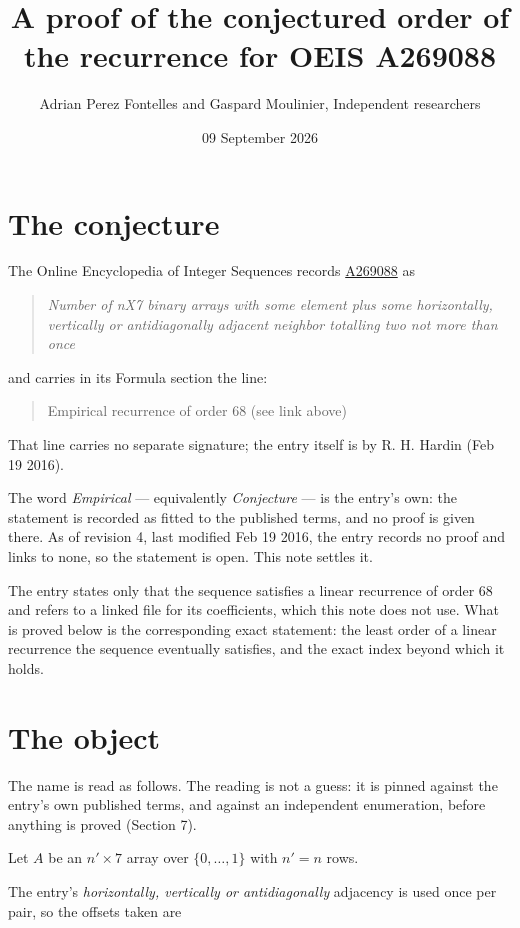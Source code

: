\documentclass[11pt]{article}
\title{A proof of the conjectured order of the recurrence for OEIS A269088}
\author{Adrian Perez Fontelles and Gaspard Moulinier, Independent researchers}
\date{09 September 2026}
\theoremstyle{definition}
\begin{document}
\maketitle
\section{The conjecture}

The Online Encyclopedia of Integer Sequences records \href{https://oeis.org/A269088}{A269088} as

\begin{quote}\itshape Number of nX7 binary arrays with some element plus some horizontally, vertically or antidiagonally adjacent neighbor totalling two not more than once\end{quote}

and carries in its Formula section the line:

\begin{quote}\ttfamily Empirical recurrence of order 68 (see link above)\end{quote}

That line carries no separate signature; the entry itself is by R. H. Hardin (Feb 19 2016).

The word {\itshape Empirical} --- equivalently {\itshape Conjecture} --- is the entry's own: the statement is recorded as fitted to the published terms, and no proof is given there. As of revision 4, last modified Feb 19 2016, the entry records no proof and links to none, so the statement is open. This note settles it.

The entry states only that the sequence satisfies a linear recurrence of order $68$ and refers to a linked file for its coefficients, which this note does not use. What is proved below is the corresponding exact statement: the least order of a linear recurrence the sequence eventually satisfies, and the exact index beyond which it holds.

\section{The object}

The name is read as follows. The reading is not a guess: it is pinned against the entry's own published terms, and against an independent enumeration, before anything is proved (Section 7).

Let $A$ be an $n' \times 7$ array over $\{0,\dots,1\}$ with $n' = n$ rows.

The entry's {\itshape horizontally, vertically or antidiagonally} adjacency is used once per pair, so the offsets taken are
\end{document}
